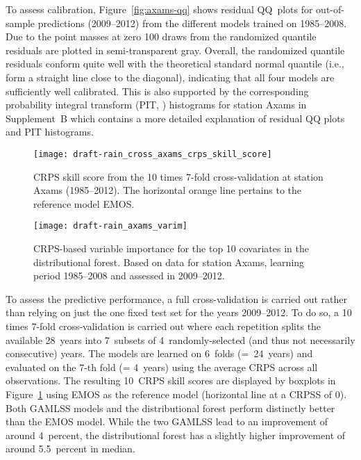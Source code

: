 \documentclass[aoas, preprint]{imsart}
\numberwithin{equation}{subsection}
\begin{document}
To assess calibration, Figure~\ref{fig:axams-qq} shows residual QQ~plots for
out-of-sample predictions (2009--2012) from the different models trained on
1985--2008. Due to the point masses at zero 100 draws from the randomized
quantile residuals \citep{Dunn+Smyth:1996} are plotted in semi-transparent
gray. Overall, the randomized quantile residuals conform quite well with the
theoretical standard normal quantile (i.e., form a straight line close to the 
diagonal), indicating that all four models are sufficiently well calibrated. 
This is also supported by the corresponding probability integral transform
(PIT, \citealp{Gneiting+Balabdaoui+Raftery:2007}) histograms for station
Axams in Supplement~B \citep{Schlosser+Hothorn+Stauffer:2019b} which 
contains a more detailed explanation of residual QQ plots and PIT histograms.


\begin{figure}[t!]
\centering
{}
\texttt{[image: draft-rain\_cross\_axams\_crps\_skill\_score]}
\caption{\label{fig:axams-crps}CRPS skill score from the 10 times 
7-fold cross-validation at station Axams (1985--2012). The horizontal orange 
line pertains to the reference model EMOS.}
\end{figure}

\begin{figure}[t!]
\centering
{}
\texttt{[image: draft-rain\_axams\_varim]}
\caption{\label{fig:axams-varimp} CRPS-based variable importance for the top 10 covariates 
in the distributional forest. Based on data for station Axams, learning period 
1985--2008 and assessed in 2009--2012.}
\end{figure}

To assess the predictive performance, a full cross-validation is carried out
rather than relying on just the one fixed test set for the years 2009--2012.
To do so, a 10 times 7-fold cross-validation is carried out where each repetition
splits the available 28~years into 7~subsets of 4~randomly-selected 
(and thus not necessarily consecutive) years.
The models are learned on 6~folds (=~24~years) and evaluated on the 7-th fold
(= 4~years) using the average CRPS across all observations.
The resulting 10~CRPS skill scores are displayed by boxplots in
Figure~\ref{fig:axams-crps} using EMOS as the reference model (horizontal
line at a CRPSS of 0). Both GAMLSS models and the distributional forest 
perform distinctly better than the EMOS model. While the two GAMLSS lead to an improvement 
of around 4~percent, the distributional forest has a slightly higher improvement
of around 5.5~percent in median.
\end{document}
